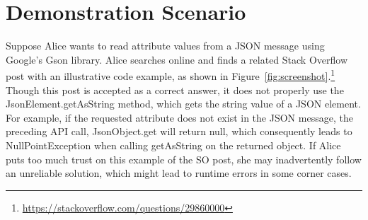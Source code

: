 \section{Demonstration Scenario}
\label{sec:motivation}

%

Suppose Alice wants to read attribute values from a {\ttt JSON} message using Google's Gson library. Alice searches online and finds a related Stack Overflow post with an illustrative code example, as shown in Figure~\ref{fig:screenshot}.\footnote{\url{https://stackoverflow.com/questions/29860000}} Though this post is accepted as a correct answer, it does not properly use the {\ttt JsonElement.getAsString} method, which gets the {\ttt string} value of a {\ttt JSON} element. For example, if the requested attribute does not exist in the {\ttt JSON} message, the preceding API call, {\ttt JsonObject.get} will return {\ttt null}, which consequently leads to {\ttt NullPointException} when calling {\ttt getAsString} on the returned object. If Alice puts too much trust on this example of the SO post, she may inadvertently follow an unreliable solution, which might lead to runtime errors in some corner cases. 

